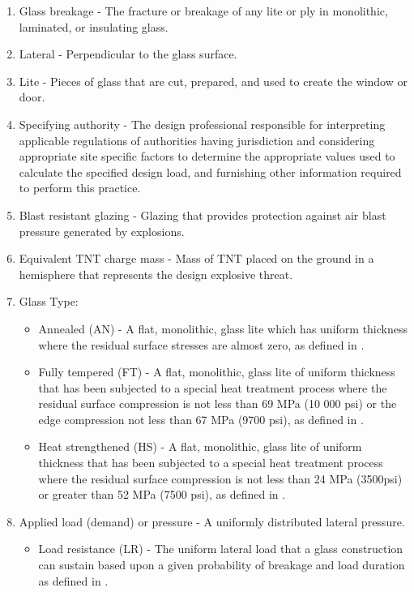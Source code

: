 \documentclass[12pt]{article}
\begin{document}
\begin{enumerate}
\item{Glass breakage - The fracture or breakage of any lite or ply in monolithic, laminated, or insulating glass.}
\item{Lateral - Perpendicular to the glass surface.}
\item{Lite - Pieces of glass that are cut, prepared, and used to create the window or door.}
\item{Specifying authority - The design professional responsible for interpreting applicable regulations of authorities having jurisdiction and considering appropriate site specific factors to determine the appropriate values used to calculate the specified design load, and furnishing other information required to perform this practice.}
\item{Blast resistant glazing - Glazing that provides protection against air blast pressure generated by explosions.}
\item{Equivalent TNT charge mass - Mass of TNT placed on the ground in a hemisphere that represents the design explosive threat.}
\item{Glass Type:}
\begin{itemize}
\item{Annealed (AN) - A flat, monolithic, glass lite which has uniform thickness where the residual surface stresses are almost zero, as defined in \cite{astm2016}.}
\item{Fully tempered (FT) - A flat, monolithic, glass lite of uniform thickness that has been subjected to a special heat treatment process where the residual surface compression is not less than 69 MPa (10 000 psi) or the edge compression not less than 67 MPa (9700 psi), as defined in \cite{astm2012}.}
\item{Heat strengthened (HS) - A flat, monolithic, glass lite of uniform thickness that has been subjected to a special heat treatment process where the residual surface compression is not less than 24 MPa (3500psi) or greater than 52 MPa (7500 psi), as defined in \cite{astm2012}.}
\end{itemize}
\item{Applied load (demand) or pressure - A uniformly distributed lateral pressure.}
\begin{itemize}
\item{Load resistance (LR) - The uniform lateral load that a glass construction can sustain based upon a given probability of breakage and load duration as defined in \cite[(pp. 1 and 53)]{astm2009}.}

\end{itemize}
\end{enumerate}
\end{document}
